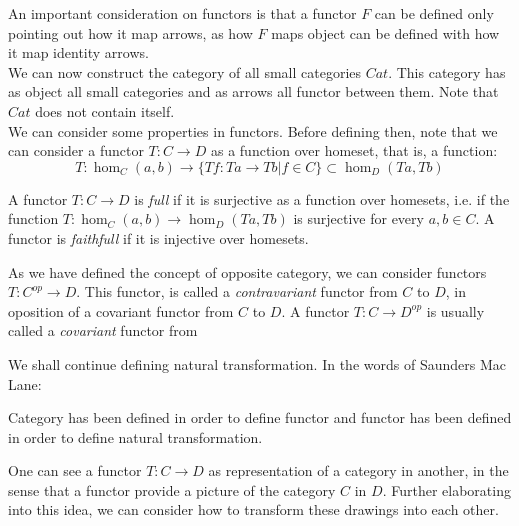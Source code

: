 An  important consideration on functors is that a functor $F$ can be defined only pointing out how it map arrows, as how $F$ maps object can be defined with how it map identity arrows.\\

We can now construct the category of all small categories $Cat$. This category has as object all small categories and as arrows all functor between them. Note that $Cat$ does not contain itself.\\

We can consider some properties in functors. Before defining then, note that we can consider a functor $T:C\to D$ as a function over homeset, that is, a function: 
$$T:\hom_C(a,b) \to \{Tf: Ta \to Tb | f \in C\} \subset \hom_D(Ta,Tb)$$

\begin{definition}
  A functor $T:C\to D$ is \emph{full} if it is surjective as a function over homesets, i.e. if the function $T:\hom_C(a,b) \to  \hom_D(Ta,Tb)$  is surjective for every $a,b \in C$. A functor is \emph{faithfull} if it is injective over homesets.
\end{definition}

As we have defined the concept of opposite category, we can consider functors $T:C^{op} \to D$. This functor, is called a \emph{contravariant} functor from $C$ to $D$, in oposition of a covariant functor from $C$ to $D$. A functor $T: C \to D^{op}$ is usually called a \emph{covariant} functor from 



We shall continue defining natural transformation. In the words of Saunders Mac Lane:

\begin{displayquote}
Category has been defined in order to define functor and functor has been defined in order to define natural transformation.
\end{displayquote}




One can see a functor $T:C\to D$ as representation of a category in another, in the sense that a functor provide a picture of the category $C$ in $D$. Further elaborating into this idea, we can consider how to transform these drawings into each other. 


